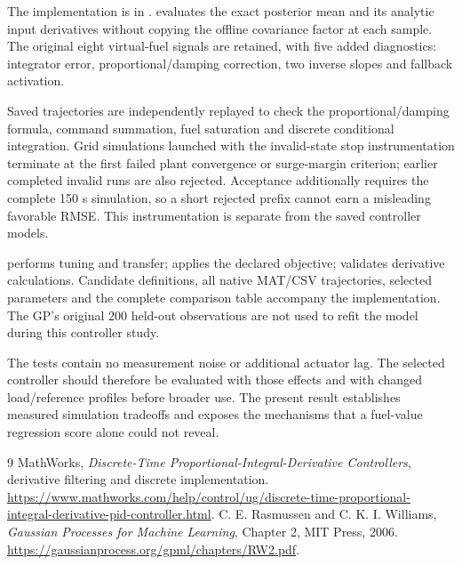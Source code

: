 \documentclass[11pt,a4paper]{article}
\begin{document}
The implementation is in .  evaluates the exact posterior mean and its analytic input derivatives without copying the offline covariance factor at each sample. The original eight virtual-fuel signals are retained, with five added diagnostics: integrator error, proportional/damping correction, two inverse slopes and fallback activation.

Saved trajectories are independently replayed to check the proportional/damping formula, command summation, fuel saturation and discrete conditional integration. Grid simulations launched with the invalid-state stop instrumentation terminate at the first failed plant convergence or surge-margin criterion; earlier completed invalid runs are also rejected. Acceptance additionally requires the complete 150 s simulation, so a short rejected prefix cannot earn a misleading favorable RMSE. This instrumentation is separate from the saved controller models.

 performs tuning and transfer;  applies the declared objective;  validates derivative calculations. Candidate definitions, all native MAT/CSV trajectories, selected parameters and the complete comparison table accompany the implementation. The GP's original 200 held-out observations are not used to refit the model during this controller study.

The tests contain no measurement noise or additional actuator lag. The selected controller should therefore be evaluated with those effects and with changed load/reference profiles before broader use. The present result establishes measured simulation tradeoffs and exposes the mechanisms that a fuel-value regression score alone could not reveal.

\begin{thebibliography}{9}
 MathWorks, \emph{Discrete-Time Proportional-Integral-Derivative Controllers}, derivative filtering and discrete implementation. \url{https://www.mathworks.com/help/control/ug/discrete-time-proportional-integral-derivative-pid-controller.html}.
 C. E. Rasmussen and C. K. I. Williams, \emph{Gaussian Processes for Machine Learning}, Chapter 2, MIT Press, 2006. \url{https://gaussianprocess.org/gpml/chapters/RW2.pdf}.
\end{thebibliography}
\end{document}
